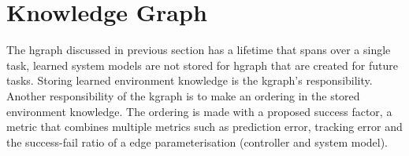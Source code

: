 \section{Knowledge Graph}%
\label{sec:kgraph}
The \ac{hgraph} discussed in previous section has a lifetime that spans over a single task, learned system models are not stored for \ac{hgraph} that are created for future tasks. Storing learned environment knowledge is the \ac{kgraph}'s responsibility. Another responsibility of the \ac{kgraph} is to make an ordering in the stored environment knowledge. The ordering is made with a proposed success factor, a metric that combines multiple metrics such as prediction error, tracking error and the success-fail ratio of a edge parameterisation (controller and system model). 










